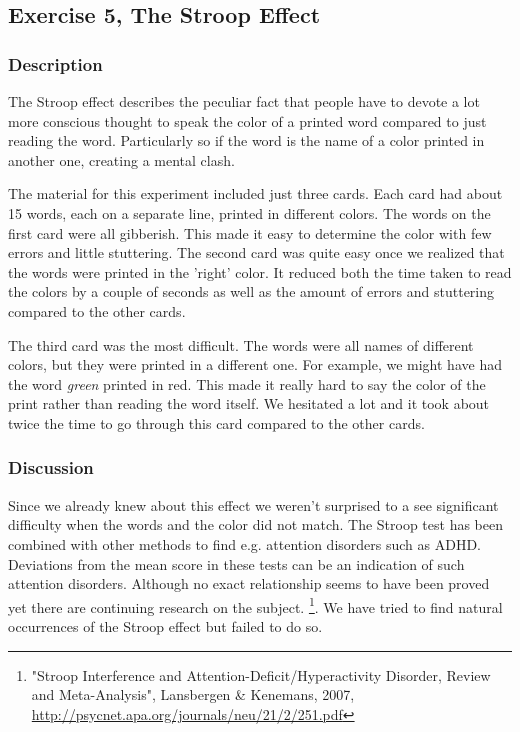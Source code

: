 \documentclass[10pt, a4paper]{article}
\begin{document}
\subsection{Exercise 5, The Stroop Effect}
\subsubsection{Description}
The Stroop effect describes the peculiar fact that people have to devote a lot more conscious thought to speak the color of a printed word compared to just reading the word. Particularly so if the word is the name of a color printed in another one, creating a mental clash.

The material for this experiment included just three cards.  Each card had about 15 words, each on a separate line, printed in different colors.  The words on the first card were all gibberish. This made it easy to determine the color with few errors and little stuttering. 
The second card was quite easy once we realized that the words were printed in the 'right' color. It reduced both the time taken to read the colors by a couple of seconds as well as the amount of errors and stuttering compared to the other cards.

The third card was the most difficult. The words were all names of different colors, but they were printed in a different one. For example, we might have had the word \emph{green} printed in red. This made it really hard to say the color of the print rather than reading the word itself.  We hesitated a lot and it took about twice the time to go through this card compared to the other cards. 

\subsubsection{Discussion}
Since we already knew about this effect we weren't surprised to a see significant difficulty when the words and the color did not match. The Stroop test has been combined with other methods to find e.g. attention disorders such as ADHD. Deviations from the mean score in these tests can be an indication of such attention disorders. Although no exact relationship seems to have been proved yet there are continuing research on the subject. \footnote{"Stroop Interference and Attention-Deficit/Hyperactivity Disorder, Review and Meta-Analysis", Lansbergen \& Kenemans, 2007, \url{http://psycnet.apa.org/journals/neu/21/2/251.pdf}}. We have tried to find natural occurrences of the Stroop effect but failed to do so.\\[5mm]
\end{document}

